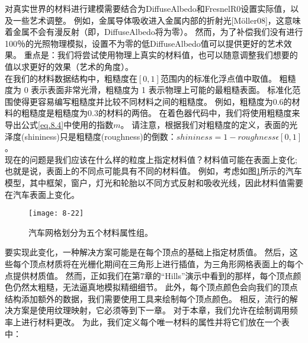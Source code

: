 \begin{flushleft}
对真实世界的材料进行建模需要结合为DiffuseAlbedo和FresnelR0设置实际值，以及一些艺术调整。 例如，金属导体吸收进入金属内部的折射光[Möller08]，这意味着金属不会有漫反射（即，DiffuseAlbedo将为零）。 然而，为了补偿我们没有进行100％的光照物理模拟，设置不为零的低DiffuseAlbedo值可以提供更好的艺术效果。 重点是：我们将尝试使用物理上真实的材料值，也可以随意调整我们想要的值以求更好的效果（艺术的角度）。\\
在我们的材料数据结构中，粗糙度在$[0,1]$范围内的标准化浮点值中取值。 粗糙度为 0 表示表面非常光滑，粗糙度为 1 表示物理上可能的最粗糙表面。 标准化范围使得更容易编写粗糙度并比较不同材料之间的粗糙度。 例如，粗糙度为0.6的材料的粗糙度是粗糙度为0.3的材料的两倍。 在着色器代码中，我们将使用粗糙度来导出公式\ref{eq.8.4}中使用的指数$m$。 请注意，根据我们对粗糙度的定义，表面的光泽度(shininess)只是粗糙度(roughness)的倒数：$shininess=1-roughness \epsilon [0,1]$。\\

现在的问题是我们应该在什么样的粒度上指定材料值？材料值可能在表面上变化; 也就是说，表面上的不同点可能具有不同的材料值。 例如，考虑如图\ref{fig:8-22}所示的汽车模型，其中框架，窗户，灯光和轮胎以不同方式反射和吸收光线，因此材料值需要在汽车表面上变化。
\end{flushleft}

\begin{figure}[h]
    \texttt{[image: 8-22]}
    \centering
    \caption{汽车网格划分为五个材料属性组。}
    \label{fig:8-22}
\end{figure}

\begin{flushleft}
要实现此变化，一种解决方案可能是在每个顶点的基础上指定材质值。 然后，这些每个顶点材质将在光栅化期间在三角形上进行插值，为三角形网格表面上的每个点提供材质值。 然而，正如我们在第7章的“Hills”演示中看到的那样，每个顶点颜色仍然太粗糙，无法逼真地模拟精细细节。 此外，每个顶点颜色会向我们的顶点结构添加额外的数据，我们需要使用工具来绘制每个顶点颜色。 相反，流行的解决方案是使用纹理映射，它必须等到下一章。 对于本章，我们允许在绘制调用频率上进行材料更改。 为此，我们定义每个唯一材料的属性并将它们放在一个表中：\\
\end{flushleft}

